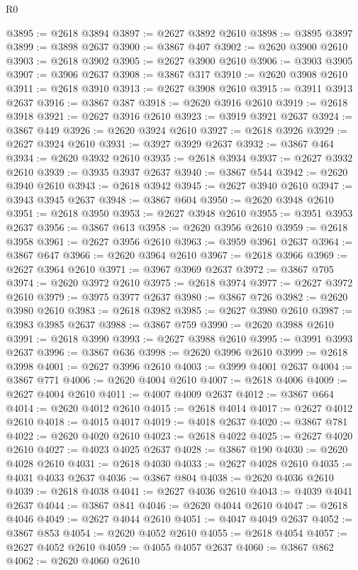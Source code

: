 \begin{lexlean}{R0}
\begin{coremodule}
@3895 := @2618 @3894
@3897 := @2627 @3892 @2610
@3898 := @3895 @3897
@3899 := @3898 @2637
@3900 := @3867 @407
@3902 := @2620 @3900 @2610
@3903 := @2618 @3902
@3905 := @2627 @3900 @2610
@3906 := @3903 @3905
@3907 := @3906 @2637
@3908 := @3867 @317
@3910 := @2620 @3908 @2610
@3911 := @2618 @3910
@3913 := @2627 @3908 @2610
@3915 := @3911 @3913 @2637
@3916 := @3867 @387
@3918 := @2620 @3916 @2610
@3919 := @2618 @3918
@3921 := @2627 @3916 @2610
@3923 := @3919 @3921 @2637
@3924 := @3867 @449
@3926 := @2620 @3924 @2610
@3927 := @2618 @3926
@3929 := @2627 @3924 @2610
@3931 := @3927 @3929 @2637
@3932 := @3867 @464
@3934 := @2620 @3932 @2610
@3935 := @2618 @3934
@3937 := @2627 @3932 @2610
@3939 := @3935 @3937 @2637
@3940 := @3867 @544
@3942 := @2620 @3940 @2610
@3943 := @2618 @3942
@3945 := @2627 @3940 @2610
@3947 := @3943 @3945 @2637
@3948 := @3867 @604
@3950 := @2620 @3948 @2610
@3951 := @2618 @3950
@3953 := @2627 @3948 @2610
@3955 := @3951 @3953 @2637
@3956 := @3867 @613
@3958 := @2620 @3956 @2610
@3959 := @2618 @3958
@3961 := @2627 @3956 @2610
@3963 := @3959 @3961 @2637
@3964 := @3867 @647
@3966 := @2620 @3964 @2610
@3967 := @2618 @3966
@3969 := @2627 @3964 @2610
@3971 := @3967 @3969 @2637
@3972 := @3867 @705
@3974 := @2620 @3972 @2610
@3975 := @2618 @3974
@3977 := @2627 @3972 @2610
@3979 := @3975 @3977 @2637
@3980 := @3867 @726
@3982 := @2620 @3980 @2610
@3983 := @2618 @3982
@3985 := @2627 @3980 @2610
@3987 := @3983 @3985 @2637
@3988 := @3867 @759
@3990 := @2620 @3988 @2610
@3991 := @2618 @3990
@3993 := @2627 @3988 @2610
@3995 := @3991 @3993 @2637
@3996 := @3867 @636
@3998 := @2620 @3996 @2610
@3999 := @2618 @3998
@4001 := @2627 @3996 @2610
@4003 := @3999 @4001 @2637
@4004 := @3867 @771
@4006 := @2620 @4004 @2610
@4007 := @2618 @4006
@4009 := @2627 @4004 @2610
@4011 := @4007 @4009 @2637
@4012 := @3867 @664
@4014 := @2620 @4012 @2610
@4015 := @2618 @4014
@4017 := @2627 @4012 @2610
@4018 := @4015 @4017
@4019 := @4018 @2637
@4020 := @3867 @781
@4022 := @2620 @4020 @2610
@4023 := @2618 @4022
@4025 := @2627 @4020 @2610
@4027 := @4023 @4025 @2637
@4028 := @3867 @190
@4030 := @2620 @4028 @2610
@4031 := @2618 @4030
@4033 := @2627 @4028 @2610
@4035 := @4031 @4033 @2637
@4036 := @3867 @804
@4038 := @2620 @4036 @2610
@4039 := @2618 @4038
@4041 := @2627 @4036 @2610
@4043 := @4039 @4041 @2637
@4044 := @3867 @841
@4046 := @2620 @4044 @2610
@4047 := @2618 @4046
@4049 := @2627 @4044 @2610
@4051 := @4047 @4049 @2637
@4052 := @3867 @853
@4054 := @2620 @4052 @2610
@4055 := @2618 @4054
@4057 := @2627 @4052 @2610
@4059 := @4055 @4057 @2637
@4060 := @3867 @862
@4062 := @2620 @4060 @2610

\end{coremodule}
\end{lexlean}

